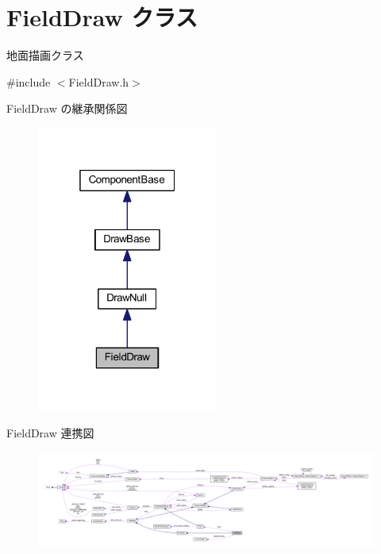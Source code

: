 \hypertarget{class_field_draw}{}\section{Field\+Draw クラス}
\label{class_field_draw}


地面描画クラス  




{\ttfamily \#include $<$Field\+Draw.\+h$>$}



Field\+Draw の継承関係図\nopagebreak
\begin{figure}[H]
\begin{center}
\leavevmode
\includegraphics[width=169pt]{class_field_draw__inherit__graph}
\end{center}
\end{figure}


Field\+Draw 連携図\nopagebreak
\begin{figure}[H]
\begin{center}
\leavevmode
\includegraphics[width=350pt]{class_field_draw__coll__graph}
\end{center}
\end{figure}
